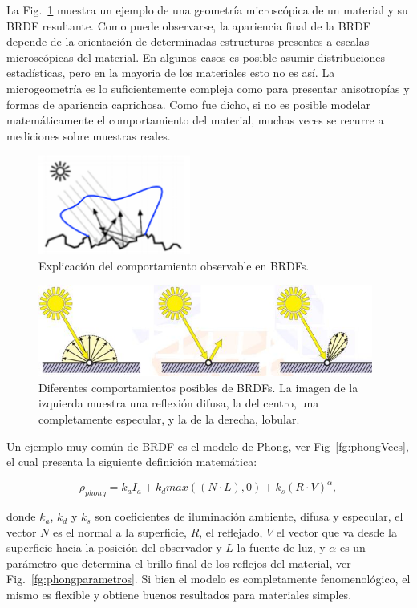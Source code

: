 La Fig.~\ref{fg:microestructura} muestra un ejemplo de una geometría microscópica de un material y su BRDF resultante.
Como puede observarse, la apariencia final de la BRDF depende de la orientación de determinadas estructuras presentes a escalas microscópicas del material.
En algunos casos es posible asumir distribuciones estadísticas, pero en la mayoria de los materiales esto no es así.
La microgeometría es lo suficientemente compleja como para presentar anisotropías y formas de apariencia caprichosa.
Como fue dicho, si no es posible modelar matemáticamente el comportamiento del material, muchas veces se recurre a mediciones sobre muestras reales.


\begin{figure}
\center
\includegraphics[width=5cm]{figures/microestructura}
\caption{Explicación del comportamiento observable en BRDFs.}
\label{fg:microestructura}
\end{figure}


\begin{figure}
\center
\includegraphics[width=11cm]{figures/contribuciones}
\caption{Diferentes comportamientos posibles de BRDFs. La imagen de la izquierda muestra una reflexión difusa, la del centro, una completamente especular, y la de la derecha, lobular.}
\label{fg:contribuciones}
\end{figure}


Un ejemplo muy común de BRDF es el modelo de Phong, ver Fig~\ref{fg:phongVecs}, el cual presenta la siguiente definición matemática:

$$\rho_{phong} =  k_{a} I_{a} + k_{d} max((N \cdot L),0) + k_{s} (R \cdot V)^{\alpha},$$

donde $k_{a}$, $k_{d}$ y $k_{s}$ son coeficientes de iluminación ambiente, difusa y especular, el vector $N$ es el normal a la superficie, $R$, el reflejado, $V$ el vector que va desde la superficie hacia la posición del observador y $L$ la fuente de luz, y $\alpha$ es un parámetro que determina el brillo final de los reflejos del material, ver Fig.~\ref{fg:phongparametros}.
Si bien el modelo es completamente fenomenológico, el mismo es flexible y obtiene buenos resultados para materiales simples.


